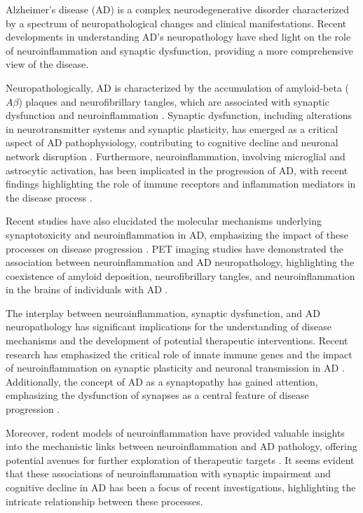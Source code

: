 \documentclass[10pt]{article}
\begin{document}
\begin{sloppypar}
  Alzheimer's disease (AD) is a complex neurodegenerative disorder characterized by a spectrum of neuropathological changes and clinical manifestations. Recent developments in understanding AD's neuropathology have shed light on the role of neuroinflammation and synaptic dysfunction, providing a more comprehensive view of the disease.

  Neuropathologically, AD is characterized by the accumulation of amyloid-beta ($A\beta$) plaques and neurofibrillary tangles, which are associated with synaptic dysfunction and neuroinflammation \citep{marcello_synaptic_2012}. Synaptic dysfunction, including alterations in neurotransmitter systems and synaptic plasticity, has emerged as a critical aspect of AD pathophysiology, contributing to cognitive decline and neuronal network disruption \citep{marcello_synaptic_2012}. Furthermore, neuroinflammation, involving microglial and astrocytic activation, has been implicated in the progression of AD, with recent findings highlighting the role of immune receptors and inflammation mediators in the disease process \citep{heneka_neuroinflammation_2015}.

  Recent studies have also elucidated the molecular mechanisms underlying synaptotoxicity and neuroinflammation in AD, emphasizing the impact of these processes on disease progression \citep{marttinen_molecular_2018}. PET imaging studies have demonstrated the association between neuroinflammation and AD neuropathology, highlighting the coexistence of amyloid deposition, neurofibrillary tangles, and neuroinflammation in the brains of individuals with AD \citep{zhou_pet_2021}.

  The interplay between neuroinflammation, synaptic dysfunction, and AD neuropathology has significant implications for the understanding of disease mechanisms and the development of potential therapeutic interventions. Recent research has emphasized the critical role of innate immune genes and the impact of neuroinflammation on synaptic plasticity and neuronal transmission in AD \citep{ransohoff_how_2016}. Additionally, the concept of AD as a synaptopathy has gained attention, emphasizing the dysfunction of synapses as a central feature of disease progression \citep{meftah_alzheimers_2023}.

  Moreover, rodent models of neuroinflammation have provided valuable insights into the mechanistic links between neuroinflammation and AD pathology, offering potential avenues for further exploration of therapeutic targets \citep{nazem_rodent_2015}. It seems evident that these associations of neuroinflammation with synaptic impairment and cognitive decline in AD has been a focus of recent investigations, highlighting the intricate relationship between these processes.


\end{sloppypar}
\end{document}
